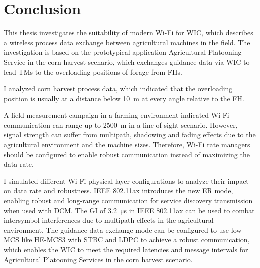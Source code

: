 \chapter{Conclusion}
\acresetall
\begin{comment}
    \begin{itemize}
    \item summarize again what your paper did, but now emphasize more the results, and comparisons
    \item write conclusions that can be drawn from the results found and the discussion presented in the paper
    \item future work (be very brief, explain what, but not much how, do not speculate about results or impact)
    \item recommended length: one page.
    \end{itemize}
\end{comment}

This thesis investigates the suitability of modern Wi-Fi for \ac{WIC}, which describes a wireless process data exchange between agricultural machines in the field.
The investigation is based on the prototypical application Agricultural Platooning Service in the corn harvest scenario, which exchanges guidance data via \ac{WIC} to lead \ac{TM}s to the overloading positions of forage from \ac{FH}s.

I analyzed corn harvest process data, which indicated that the overloading position is usually at a distance below \SI{10}{\metre} at every angle relative to the \ac{FH}.

A field measurement campaign in a farming environment indicated Wi-Fi communication can range up to \SI{2500}{\metre} in a line-of-sight scenario.
However, signal strength can suffer from multipath, shadowing and fading effects due to the agricultural environment and the machine sizes.
Therefore, Wi-Fi rate managers should be configured to enable robust communication instead of maximizing the data rate.

I simulated different Wi-Fi physical layer configurations to analyze their impact on data rate and robustness.
IEEE 802.11ax introduces the new \ac{ER} mode, enabling robust and long-range communication for service discovery transmission when used with \ac{DCM}.
The \ac{GI} of \SI{3.2}{\micro\second} in IEEE 802.11ax can be used to combat intersymbol interferences due to multipath effects in the agricultural environment.
The guidance data exchange mode can be configured to use low \ac{MCS} like \ac{HE}-\ac{MCS}3 with \ac{STBC} and \ac{LDPC} to achieve a robust communication,
which enables the \ac{WIC} to meet the required latencies and message intervals for Agricultural Platooning Services in the corn harvest scenario.

